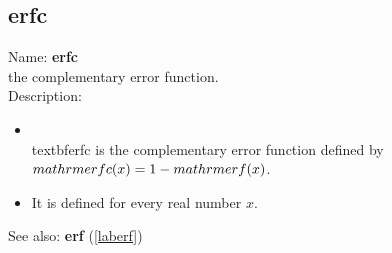 \subsection{erfc}
\label{laberfc}
\noindent Name: \textbf{erfc}\\
the complementary error function.\\
\noindent Description: \begin{itemize}

\item \\textbf{erfc} is the complementary error function defined by $\\mathrm{erfc}(x) = 1 - \\mathrm{erf}(x)$.\n
\item It is defined for every real number $x$.\n\end{itemize}
See also: \textbf{erf} (\ref{laberf})
